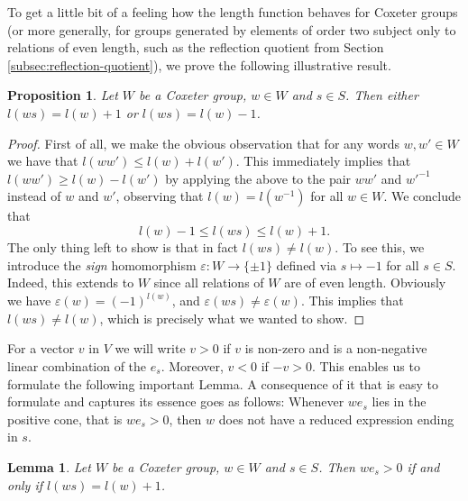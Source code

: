 \documentclass{article}
\newtheorem{lemma}[theorem]{Lemma}
\newtheorem{proposition}[theorem]{Proposition}
\theoremstyle{definition}
\begin{document}
To get a little bit of a feeling how the length function behaves for Coxeter groups (or more generally, for groups generated by elements of order two subject only to relations of even length, such as the reflection quotient from Section \ref{subsec:reflection-quotient}), we prove the following illustrative result.

\begin{proposition}
Let $W$ be a Coxeter group, $w \in W$ and $s \in S$. Then either $l(ws) = l(w) + 1$ or $l(ws) = l(w) - 1$.
\end{proposition}

\begin{proof}
First of all, we make the obvious observation that for any words 
$w, w' \in W$ we have that $l(ww') \leq l(w) + l(w')$. This immediately implies that $l(ww') \geq l(w) - l(w')$ by applying the above to the pair $ww'$ and $w'^{-1}$ instead of $w$ and $w'$, observing that $l(w) = l(w^{-1})$ for all $w \in W$. We conclude that
$$l(w) - 1 \leq l(ws) \leq l(w) + 1.$$
The only thing left to show is that in fact $l(ws) \neq l(w)$. To see this, we introduce the \textit{sign} homomorphism $\varepsilon: W \rightarrow \{\pm 1\}$ defined via $s \mapsto -1$ for all $s \in S$. Indeed, this extends to $W$ since all relations of $W$ are of even length. Obviously we have $\varepsilon(w) = (-1)^{l(w)}$, and $\varepsilon(ws) \neq \varepsilon(w)$. This implies that $l(ws) \neq l(w)$, which is precisely what we wanted to show.
\end{proof}

For a vector $v$ in $V$ we will write $v > 0$ if $v$ is non-zero and is a non-negative linear combination of the $e_s$. Moreover, $v < 0$ if $-v>0$. This enables us to formulate the following important Lemma. A consequence of it that is easy to formulate and captures its essence goes as follows: Whenever $we_s$ lies in the positive cone, that is $w e_s > 0$, then $w$ does not have a reduced expression ending in $s$.

\begin{lemma}\label{lem:humphreys5.4}
Let $W$ be a Coxeter group, $w \in W$ and $s \in S$. Then $we_s > 0$ if and only if $l(ws) = l(w) + 1$.
\end{lemma}
\end{document}
